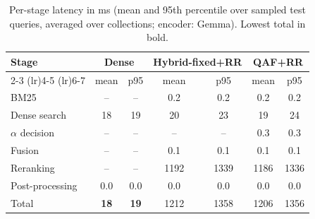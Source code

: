\begin{table}[t]
\centering
\caption{Per-stage latency in ms (mean and 95th percentile over sampled test queries, averaged over collections; encoder: Gemma). Lowest total in bold.}
\label{tab:latency}
\scriptsize
\setlength{\tabcolsep}{3pt}
\begin{tabular}{lcccccc}
\toprule
Stage & \multicolumn{2}{c}{Dense} & \multicolumn{2}{c}{Hybrid-fixed+RR} & \multicolumn{2}{c}{QAF+RR} \\
\cmidrule(lr){2-3} \cmidrule(lr){4-5} \cmidrule(lr){6-7}
 & mean & p95 & mean & p95 & mean & p95 \\
\midrule
BM25 & -- & -- & 0.2 & 0.2 & 0.2 & 0.2 \\
Dense search & 18 & 19 & 20 & 23 & 19 & 24 \\
$\alpha$ decision & -- & -- & -- & -- & 0.3 & 0.3 \\
Fusion & -- & -- & 0.1 & 0.1 & 0.1 & 0.1 \\
Reranking & -- & -- & 1192 & 1339 & 1186 & 1336 \\
Post-processing & 0.0 & 0.0 & 0.0 & 0.0 & 0.0 & 0.0 \\
Total & \textbf{18} & \textbf{19} & 1212 & 1358 & 1206 & 1356 \\
\bottomrule
\end{tabular}
\end{table}
